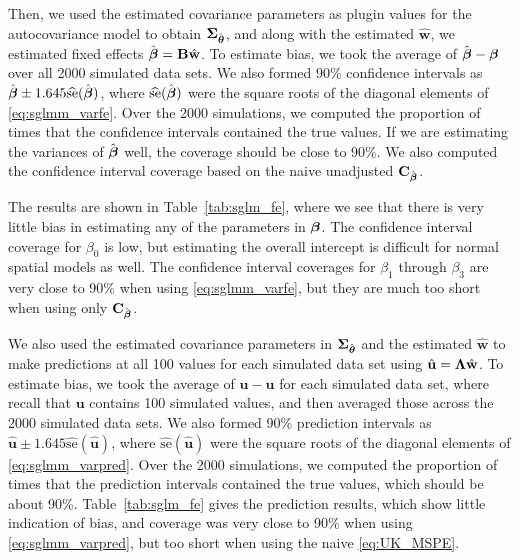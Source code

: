 \documentclass[12pt, titlepage]{article}
\begin{document}
Then, we used the estimated covariance parameters as plugin values for the autocovariance model to obtain $\mbox{\boldmath $\Sigma$}_{\hat{\boldsymbol{\theta}}}$, and along with the estimated $\hat{\mathbf{w}}$, we estimated fixed effects $\hat{\boldsymbol{\beta}} = \mathbf{B}\hat{\mathbf{w}}$.  To estimate bias, we took the average of $\hat{\boldsymbol{\beta}} - \boldsymbol{\beta}$ over all 2000 simulated data sets. We also formed 90\% confidence intervals as $\hat{\boldsymbol{\beta}} \pm 1.645 \widehat{\textrm{se}}(\hat{\boldsymbol{\beta}})$, where $\widehat{\textrm{se}}(\hat{\boldsymbol{\beta}})$ were the square roots of the diagonal elements of \eqref{eq:sglmm_varfe}.  Over the 2000 simulations, we computed the proportion of times that the confidence intervals contained the true values.  If we are estimating the variances of $\hat{\boldsymbol{\beta}}$ well, the coverage should be close to 90\%. We also computed the confidence interval coverage based on the naive unadjusted $\mathbf{C}_{\hat{\boldsymbol{\beta}}}$. 

The results are shown in Table~\ref{tab:sglm_fe}, where we see that there is very little bias in estimating any of the parameters in $\boldsymbol{\beta}$.  The confidence interval coverage for $\beta_{0}$ is low, but estimating the overall intercept is difficult for normal spatial models as well.  The confidence interval coverages for $\beta_{1}$ through $\beta_{3}$ are very close to 90\% when using \eqref{eq:sglmm_varfe}, but they are much too short when using only $\mathbf{C}_{\hat{\boldsymbol{\beta}}}$.

We also used the estimated covariance parameters in $\mbox{\boldmath $\Sigma$}_{\hat{\boldsymbol{\theta}}}$ and the estimated $\hat{\mathbf{w}}$ to make predictions at all 100 values for each simulated data set using $\hat{\mathbf{u}} = \mbox{\boldmath $\Lambda$}\hat{\mathbf{w}}$.  To estimate bias, we took the average of $\hat{\mathbf{u}} - \mathbf{u}$ for each simulated data set, where recall that $\mathbf{u}$ contains 100 simulated values, and then averaged those across the 2000 simulated data sets.  We also formed 90\% prediction intervals as $\hat{\mathbf{u}} \pm 1.645 \widehat{\textrm{se}}(\hat{\mathbf{u}})$, where $\widehat{\textrm{se}}(\hat{\mathbf{u}})$ were the square roots of the diagonal elements of \eqref{eq:sglmm_varpred}. Over the 2000 simulations, we computed the proportion of times that the prediction intervals contained the true values, which should be about 90\%. Table~\ref{tab:sglm_fe} gives the prediction results, which show little indication of bias, and coverage was very close to 90\% when using \eqref{eq:sglmm_varpred}, but too short when using the naive \eqref{eq:UK_MSPE}.
\end{document}
